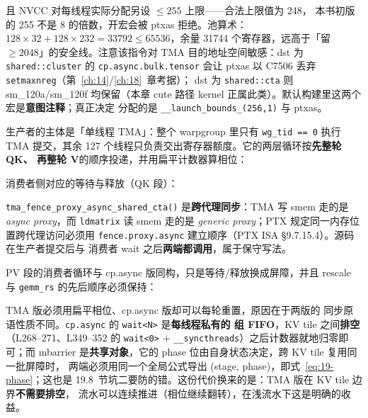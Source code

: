 \begin{itemize}[itemsep=2pt,topsep=2pt]
        且 NVCC 对每线程实际分配另设 $\le 255$ 上限——合法上限值为 248，
        本书初版的 255 不是 8 的倍数，开宏会被 ptxas 拒绝。池算术：
        $128 \times 32 + 128 \times 232 = 33792 \le 65536$，余量
        31744 个寄存器，远高于「留 $\ge 2048$」的安全线。注意该指令对 TMA 目的地址空间敏感：dst 为
        \texttt{shared::cluster} 的 \texttt{cp.\allowbreak{}async.\allowbreak{}bulk.\allowbreak{}tensor} 会让 ptxas 以
        C7506 丢弃 \texttt{setmaxnreg}（第~\ref{ch:14}/\ref{ch:18}~章考据）；
        dst 为 \texttt{shared::cta} 则 sm\_120a/sm\_120f 均保留（本章
        cute 路径 kernel 正属此类）。默认构建里这两个宏是\textbf{意图注释}；真正决定
        分配的是 \texttt{\_\allowbreak{}\_\allowbreak{}launch\_\allowbreak{}bounds\_\allowbreak{}(256,\allowbreak{}1)} 与 ptxas。
\end{itemize}

生产者的主体是「单线程 TMA」：整个 warpgroup 里只有 \texttt{wg\_tid == 0}
执行 TMA 提交，其余 127 个线程只负责交出寄存器额度。它的两层循环按\textbf{先整轮 QK、
再整轮 V}的顺序投递，并用扁平计数器算相位：



消费者侧对应的等待与释放（QK 段）：



\texttt{tma\_\allowbreak{}fence\_\allowbreak{}proxy\_\allowbreak{}async\_\allowbreak{}shared\_\allowbreak{}cta\allowbreak{}()} 是\textbf{跨代理同步}：TMA 写
smem 走的是 \emph{async proxy}，而 \texttt{ldmatrix} 读 smem 走的是
\emph{generic proxy}；PTX 规定同一内存位置跨代理访问必须用
\texttt{fence.\allowbreak{}proxy.\allowbreak{}async} 建立顺序（PTX ISA §9.7.15.4）。源码在生产者提交后与
消费者 wait 之后\textbf{两端都调用}，属于保守写法。

PV 段的消费者循环与 cp.async 版同构，只是等待/释放换成屏障，并且 rescale 与
\texttt{gemm\_rs} 的先后顺序必须保持：



TMA 版必须用扁平相位、cp.async 版却可以每轮重置，原因在于两版的
同步原语性质不同。\texttt{cp.async} 的 \texttt{wait<N>} 是\textbf{每线程私有的
组 FIFO}，KV tile 之间\textbf{排空}（L268--271、L349--352 的
\texttt{wait<0>} $+$ \texttt{\_\allowbreak{}\_\allowbreak{}syncthreads}）之后计数器就地归零即可；而 mbarrier
是\textbf{共享对象}，它的 phase 位由自身状态决定，跨 KV tile 复用同一批屏障时，
两端必须用同一个全局公式导出 (stage, phase)，即式~\ref{eq:19-phase}；这也是 19.8~节坑二要防的错。这份代价换来的是：TMA 版在 KV tile 边界\textbf{不需要排空}，
流水可以连续推进（相位继续翻转），在浅流水下这是明确的收益。

